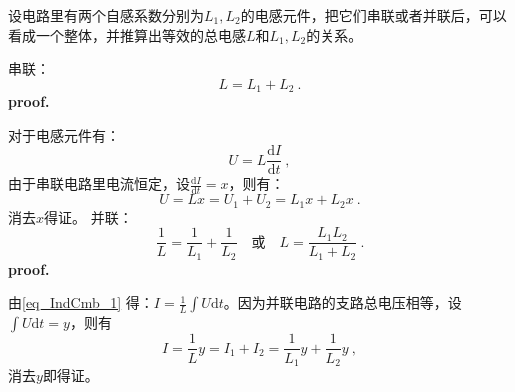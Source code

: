 
\begin{issues}
\issueDraft
\end{issues}

设电路里有两个自感系数分别为$L_1,L_2$的电感元件，把它们串联或者并联后，可以看成一个整体，并推算出等效的总电感$L$和$L_1,L_2$的关系。


串联：
\begin{equation}
L = L_1 + L_2~.
\end{equation}
\textbf{proof.}

对于电感元件有：
\begin{equation}\label{eq_IndCmb_1}
U=L\frac{\mathrm d I}{\mathrm d t}~,
\end{equation}
由于串联电路里电流恒定，设$\frac{\mathrm d I}{\mathrm d t}=x$，则有：
\begin{equation}
U=Lx=U_1+U_2=L_1x+L_2x~.
\end{equation}
消去$x$得证。
并联：
\begin{equation}
\frac{1}{L} = \frac{1}{L_1} + \frac{1}{L_2}
\quad \text{或} \quad
L = \frac{L_1L_2}{L_1 + L_2}~.
\end{equation}
\textbf{proof.}

由\autoref{eq_IndCmb_1} 得：$I=\frac{1}{L}\int U\mathrm dt$。因为并联电路的支路总电压相等，设$\int U\mathrm dt=y$，则有
\begin{equation}
I=\frac{1}{L}y=I_1+I_2=\frac{1}{L_1}y+\frac{1}{L_2}y~,
\end{equation}
消去$y$即得证。


